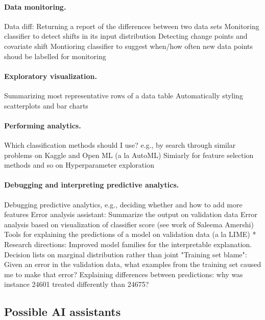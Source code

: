 \documentclass[sigplan,preprint,10pt]{acmart}\settopmatter{printfolios=true,printccs=false,printacmref=false}
\theoremstyle{plain}
\theoremstyle{definition}
\begin{document}
{\paragraph{Data monitoring.}
Data diff: Returning a report of the differences between two data sets
Monitoring classifier to detect shifts in its input distribution
Detecting change points and covariate shift
Montioring classifier to suggest when/how often new data points shoud be labelled for monitoring

\paragraph{Exploratory visualization.}
Summarizing most representative rows of a data table
Automatically styling scatterplots and bar charts

\paragraph{Performing analytics.}
Which classification methods should I use? e.g., by search through similar problems on Kaggle and Open ML (a la AutoML)
Simiarly for feature selection methods and so on
Hyperparameter exploration

\paragraph{Debugging and interpreting predictive analytics.}
Debugging predictive analytics, e.g., deciding whether and how to add more features
Error analysis assistant: Summarize the output on validation data
Error analysis based on visualization of classifier score (see work of Saleema Amershi)
Tools for explaining the predictions of a model on validation data (a la LIME) * Research directions: Improved model families for the interpretable explanation. Decision lists on marginal distribution rather than joint
"Training set blame": Given an error in the validation data, what examples from the training set caused me to make that error?
Explaining differences between predictions: why was instance 24601 treated differently than 24675?
}
\subsection{Possible AI assistants}
\end{document}
